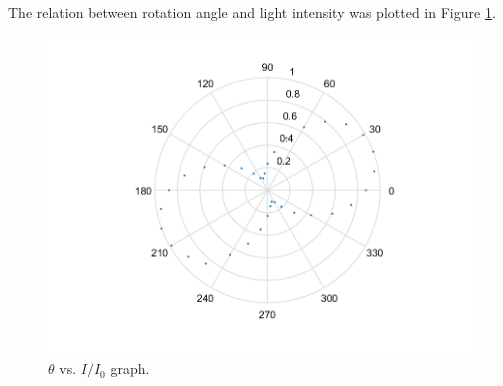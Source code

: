 The relation between rotation angle and light intensity was plotted in Figure \ref{fig-deg-20}.
\begin{figure}[H]
\centering
\includegraphics[scale=0.5]{deg-20.png}
\caption{$\theta$ vs. $I/I_0$ graph.}
\label{fig-deg-20}
\end{figure}
